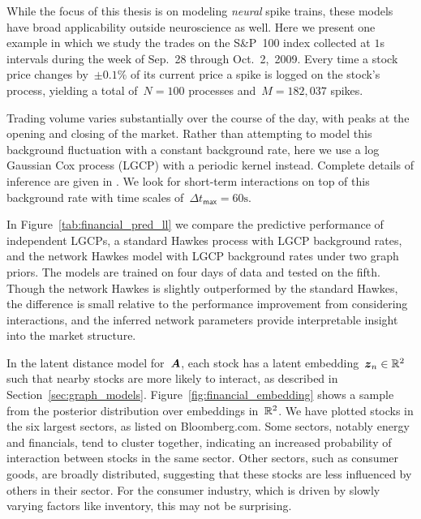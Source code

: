 While the focus of this thesis is on modeling \emph{neural}
spike trains, these models have broad applicability outside neuroscience
as well. Here we present one example in which we study the trades on the
S\&P~100 index collected at $1$s intervals during the week of Sep.~28
through Oct.~2,~2009. Every time a stock price changes by~${\pm0.1\%}$
of its current price a spike is logged on the stock's process,
yielding a total of~${N=100}$ processes and~${M=182,037}$ spikes.

Trading volume varies substantially over the course of the day, with
peaks at the opening and closing of the market. Rather than attempting
to model this background fluctuation with a constant background rate,
here we use a log Gaussian Cox process (LGCP) with a periodic kernel
instead. Complete details of inference are given in
\citet{linderman2014discovering}. We look for short-term interactions
on top of this background rate with time scales of~${\Delta
  t_{\textsf{max}}=60\mathrm{s}}$.

In Figure~\ref{tab:financial_pred_ll} we compare the
predictive performance of independent LGCPs, a standard Hawkes process
with LGCP background rates, and the network Hawkes model with LGCP
background rates under two graph priors. The models are trained on
four days of data and tested on the fifth. Though the network Hawkes
is slightly outperformed by the standard Hawkes, the difference is
small relative to the performance improvement from considering
interactions, and the inferred network parameters provide
interpretable insight into the market structure.

In the latent distance model for~$\boldsymbol{A}$, each stock has a latent
embedding~${\boldsymbol{z}_n\in\mathbb{R}^2}$ such that nearby stocks are more likely
to interact, as described in
Section~\ref{sec:graph_models}. Figure~\ref{fig:financial_embedding}
shows a sample from the posterior distribution over embeddings
in~$\mathbb{R}^2$. We have plotted stocks
in the six largest sectors, as listed on Bloomberg.com. Some sectors,
notably energy and financials, tend to cluster together, indicating an
increased probability of interaction between stocks in the same
sector. Other sectors, such as consumer goods, are broadly
distributed, suggesting that these stocks are less influenced by
others in their sector. For the consumer industry, which is driven by
slowly varying factors like inventory, this may not be surprising.


